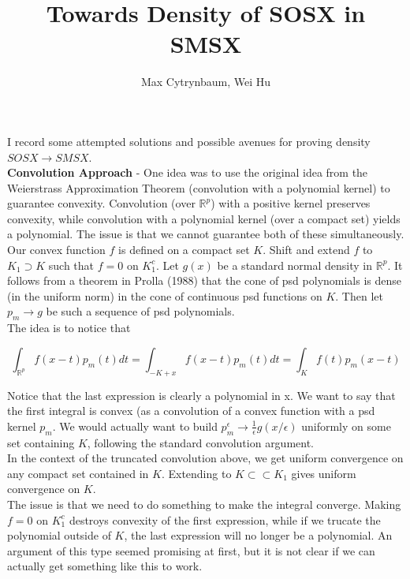 \documentclass[11pt,reqno]{amsart}
\title{Towards Density of SOSX in SMSX}
\author{Max Cytrynbaum, Wei Hu}
\theoremstyle{definition}
\numberwithin{equation}{section}
\newcommand{\eps}{\epsilon}
\newcommand{\mr}{\mathbb{R}}
\newcommand{\tb}{\textbf}
\begin{document}
\maketitle

I record some attempted solutions and possible avenues for proving density $SOSX \longrightarrow SMSX$. \\

\tb{Convolution Approach} - One idea was to use the original idea from the Weierstrass Approximation Theorem (convolution with a polynomial kernel) to guarantee convexity. Convolution (over $\mr^p$) with a positive kernel preserves convexity, while convolution with a polynomial kernel (over a compact set) yields a polynomial. The issue is that we cannot guarantee both of these simultaneously. \\

Our convex function $f$ is defined on a compact set $K$. Shift and extend $f$ to $K_1 \supset K$ such that $f = 0$ on $K_1^c$. Let $g(x)$ be a standard normal density in $\mr^p$. It follows from a theorem in Prolla (1988) that the cone of psd polynomials is dense (in the uniform norm) in the cone of continuous psd functions on $K$. Then let $p_m \to g$ be such a sequence of psd polynomials. \\

The idea is to notice that 

\[
\int_{\mr^p} f(x - t)p_m(t) dt = \int_{-K + x} f(x - t)p_m(t) dt = \int_{K} f(t)p_m(x - t)
\]

Notice that the last expression is clearly a polynomial in x. We want to say that the first integral is convex (as a convolution of a convex function with a psd kernel $p_m$. We would actually want to build $p_m^{\eps} \to \frac{1}{\eps} g(x / \eps)$ uniformly on some set containing $K$, following the standard convolution argument. \\

In the context of the truncated convolution above, we get uniform convergence on any compact set contained in $K$. Extending to $K \subset \subset K_1$ gives uniform convergence on $K$.  \\

The issue is that we need to do something to make the integral converge. Making $f = 0$ on $K_1^c$ destroys convexity of the first expression, while if we trucate the polynomial outside of $K$, the last expression will no longer be a polynomial. An argument of this type seemed promising at first, but it is not clear if we can actually get something like this to work. \\
\end{document}
